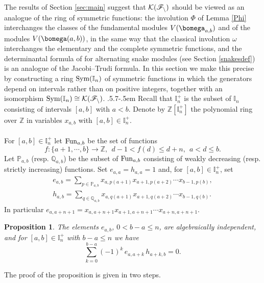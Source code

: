 \documentclass[11pt,reqno]{amsart}
\makeatletter
\newtheorem*{prop}{Proposition}
\theoremstyle{definition} \newtheorem*{defn}{Definition}
\theoremstyle{definition}
\numberwithin{equation}{section}
\def\subsection{\def\@secnumfont{\bfseries}\@startsection{subsection}{2}%
  {\parindent}{.5\linespacing\@plus.7\linespacing}{-.5em}%
  {\normalfont\bfseries}}
\makeatother
\begin{document}
The results of Section \ref{sec:main} suggest that $\cal K(\mathscr F_n)$ should be viewed as an analogue of the
ring of symmetric functions: the involution $\Phi$ of Lemma \ref{Phi} interchanges the classes of
the fundamental modules $V(\bomega_{a,b})$ and of the modules $V(\bomega(a,b))$, in the same way that the
classical involution $\omega$ interchanges the elementary and the complete symmetric functions, and
the determinantal formula of \cite[Theorem 3]{BC25a} for alternating snake modules (see Section
\ref{snakesdef}) is an analogue of the Jacobi--Trudi formula. In this section we make this precise
by constructing a ring ${\rm Sym}(\mathbb I_n)$ of symmetric functions in which the generators depend
on intervals rather than on positive integers, together with an isomorphism
${\rm Sym}(\mathbb I_n)\cong\cal K(\mathscr F_n)$.
\subsection{} Recall that $\mathbb I_n^+$ is the subset of $\mathbb I_n$ consisting of intervals $[a,b]$ with $a<b$. Denote by $\mathbb Z[\mathbb I^+_n]$ the polynomial ring over $\mathbb Z$ in variables $x_{a,b}$ with $[a,b]\in\mathbb I_n^+$.\\\\
For $[a,b]\in\mathbb I_n^+$ let ${\rm Fun}_{a,b}$ be the set of functions $$f:\{a+1,\cdots,b\}\to\mathbb Z,\ \ d-1<f(d)\le d+n,\ \ a<d\le b.$$ Let $\mathbb P_{a,b}$ (resp. $\mathbb Q_{a,b}$) be the subset of ${\rm Fun}_{a,b}$ consisting of weakly decreasing (resp. strictly increasing) functions.
Set $e_{a,a}=h_{a,a}=1$ and,
for $[a,b]\in\mathbb I_n^+$, set \begin{gather}\label{eab}
e_{a,b}=\sum_{p\in\mathbb P_{a,b}}x_{a,p(a+1)}x_{a+1,p(a+2)}\cdots x_{b-1,p(b)},\\
h_{a,b}=\sum_{q\in \mathbb Q_{a,b}}x_{a,q(a+1)}x_{a+1,q(a+2)}\cdots x_{b-1,q(b)}.
\end{gather}
In particular $e_{a,a+n+1}=x_{a,a+n+1}x_{a+1,a+n+1}\cdots x_{a+n,a+n+1}$.
\begin{prop}\label{ehrel}
    The elements $e_{a,b}$, $0<b-a\le n$, are algebraically independent, and for $[a,b]\in\mathbb I_n^+$ with $b-a\le n$ we have $$\sum_{k=0}^{b-a}(-1)^k\,e_{a,a+k}\,h_{a+k,b}=0.$$
\end{prop}
The proof of the proposition is given in two steps.
\end{document}
